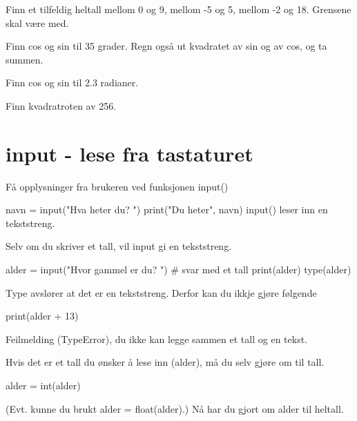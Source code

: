 {\begin{question}
Finn et tilfeldig heltall mellom 0 og 9, mellom -5 og 5, mellom -2 og 18. Grensene skal være med.
\end{question}

\begin{question}
Finn cos og sin til 35 grader. Regn også ut kvadratet av sin og av cos, og ta summen.
\end{question}

\begin{question}
Finn cos og sin til 2.3 radianer.
\end{question}

\begin{question}
Finn kvadratroten av 256.
\end{question}

\section{input - lese fra tastaturet}

Få opplysninger fra brukeren ved funksjonen input()

\begin{usncodebox}
navn = input("Hva heter du? ") 
print("Du heter", navn)
input() leser inn en tekststreng. 
\end{usncodebox}

Selv om du skriver et tall, vil input gi en tekststreng. 

\begin{usncodebox}
alder = input("Hvor gammel er du? ")   # svar med et tall 
print(alder)
type(alder)
\end{usncodebox}

Type avslører at det er en tekststreng. Derfor kan du ikkje gjøre følgende

\begin{usncodebox}
print(alder + 13)
\end{usncodebox}

Feilmelding (TypeError), du ikke kan legge sammen et tall og en tekst. 

Hvis det er et tall du ønsker å lese inn (alder), må du selv gjøre om til tall.

\begin{usncodebox}
alder = int(alder)
\end{usncodebox}

(Evt. kunne du brukt alder = float(alder).) Nå har du gjort om alder til heltall.

}

